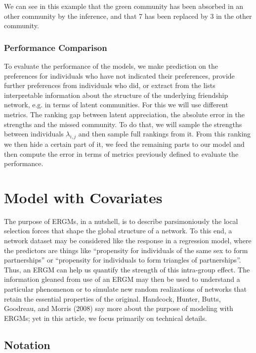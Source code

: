 \documentclass[12pt]{ociamthesis}  %
\begin{document}
	We can see in this example that the green community has been absorbed in an other community by the inference, and that 7 has been replaced by 3 in the other community.
	
	\subsection{Performance Comparison}
	
	To evaluate the performance of the models, we make prediction on the preferences for individuals who have not indicated their preferences, provide further preferences from individuals who did, or extract from the lists interpretable information about the structure of the underlying friendship network, e.g. in terms of latent communities. For this we will use different metrics. The ranking gap between latent appreciation, the absolute error in the strengths and the missed community. To do that, we will sample the strengths between individuals $\lambda_{i,j}$ and then sample full rankings from it. From this ranking we then hide a certain part of it, we feed the remaining parts to our model and then compute the error in terms of metrics previously defined to evaluate the performance.
	
	\chapter{Model with Covariates}
	
	The purpose of ERGMs, in a nutshell, is to describe parsimoniously the local selection forces
	that shape the global structure of a network. To this end, a network dataset may be considered like the response in a regression model, where the predictors are things like “propensity for individuals of the same sex to form partnerships” or “propensity for individuals to form triangles of partnerships”. Thus, an ERGM can help us quantify the strength of this intra-group effect. The information gleaned from use of an ERGM may then be used to understand a particular phenomenon or to simulate new random realizations of networks that retain the essential properties of the original. Handcock, Hunter, Butts, Goodreau, and Morris (2008) say more about the purpose of modeling with ERGMs; yet in this article, we focus primarily on technical details.
	
	\section{Notation}
	
\end{document}
